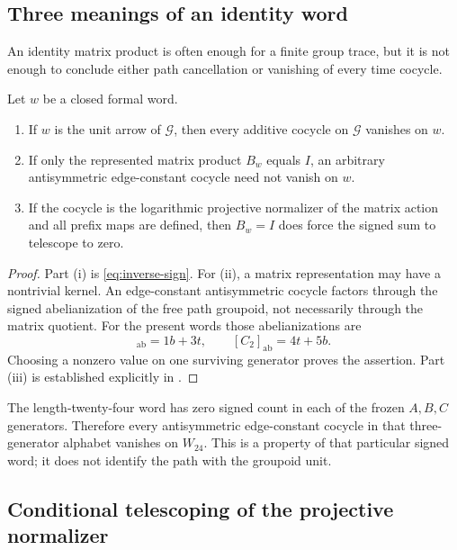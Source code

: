 \subsection{Three meanings of an identity word}

An identity matrix product is often enough for a finite group trace, but it is
not enough to conclude either path cancellation or vanishing of every time
cocycle.

\begin{proposition}
\label{prop:identity-trichotomy}
Let $w$ be a closed formal word.
\begin{enumerate}[label=(\roman*)]
\item If $w$ is the unit arrow of $\mathcal G$, then every additive cocycle on
  $\mathcal G$ vanishes on $w$.
\item If only the represented matrix product $B_w$ equals $I$, an arbitrary
  antisymmetric edge-constant cocycle need not vanish on $w$.
\item If the cocycle is the logarithmic projective normalizer of the matrix
  action and all prefix maps are defined, then $B_w=I$ does force the signed
  sum to telescope to zero.
\end{enumerate}
\end{proposition}

\begin{proof}
Part (i) is \eqref{eq:inverse-sign}.  For (ii), a matrix representation may
have a nontrivial kernel.  An edge-constant antisymmetric cocycle factors
through the signed abelianization of the free path groupoid, not necessarily
through the matrix quotient.  For the present words those abelianizations are
\begin{equation}
 [C_1]_{\mathrm{ab}}=1b+3t,\qquad
 [C_2]_{\mathrm{ab}}=4t+5b.
 \label{eq:signed-abelianizations}
\end{equation}
Choosing a nonzero value on one surviving generator proves the assertion.
Part (iii) is established explicitly in
.
\end{proof}

The length-twenty-four word has zero signed count in each of the frozen
$A,B,C$ generators.  Therefore every antisymmetric edge-constant cocycle in
that three-generator alphabet vanishes on $W_{24}$.  This is a property of
that particular signed word; it does not identify the path with the groupoid
unit.

\subsection{Conditional telescoping of the projective normalizer}

